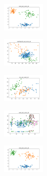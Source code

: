 \begin{figure}[H]
    \begin{subfigure}
        \centering
        \includegraphics[width=0.234\textwidth]{img/aggun/rand_set_const_20_277451237_clust.png}
    \end{subfigure}
    \hfill
    \begin{subfigure}
        \centering
        \includegraphics[width=0.234\textwidth]{img/aggun/newthyroid_set_const_20_277451237_clust.png}
    \end{subfigure}
    \hfill
    \begin{subfigure}
        \centering
        \includegraphics[width=0.234\textwidth]{img/aggun/iris_set_const_20_49258669_clust.png}
    \end{subfigure}
    \hfill
    \begin{subfigure}
        \centering
        \includegraphics[width=0.234\textwidth]{img/aggun/ecoli_set_const_20_49258669_clust.png}
    \end{subfigure}
    \hfill
    \begin{subfigure}
        \centering
        \includegraphics[width=0.234\textwidth]{img/aggun/rand_set_const_20_49258669_clust.png}
    \end{subfigure}
    \hfill
    \begin{subfigure}
        \centering

\end{subfigure}
\end{figure}
